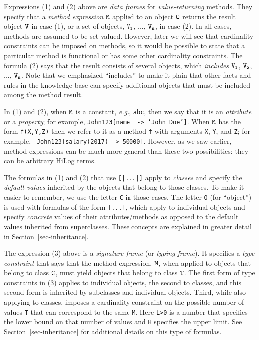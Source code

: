 \documentclass[11pt]{article}
\newcommand{\mvd}{{\mbox{\tt \,->\,}}}  %
\newcommand{\fl}{\mbox{F-logic}\xspace}
\begin{document}
\begin{itemize}
  Expressions (1) and (2) above are \emph{data frames} for
  \emph{value-returning} methods. They specify that a
  \emph{method expression} $\tt M$ applied to an object $\tt O$ returns the
  result object $\tt V$ in case (1), or a set of objects, $\tt V_1$, ...,
  $\tt V_n$, in case (2). In all cases, methods are assumed to be
  set-valued. However, later we will see that cardinality
  constraints can be imposed on methods, so it would be possible to state
  that a particular method is functional or has some other cardinality
  constraints.
  The formula (2) says that
  the result consists of several objects, which \emph{includes} $\tt V_1$,
  $\tt V_2$, ..., $\tt V_n$. Note that we emphasized ``includes''
  to make it plain that other facts and rules in the knowledge base can specify
  additional objects that must be included among the method result.
  
  In (1) and (2),
  when $\tt M$ is a constant, {\it e.g.}, {\tt abc}, then we say that it is
  an \emph{attribute} or a \emph{property}; for example, {\tt John123[name
    \mvd 'John Doe']}. When $\tt
  M$ has the form {\tt f(X,Y,Z)} then we refer to it as a method {\tt f}
  with arguments {\tt X}, {\tt Y}, and {\tt Z}; for example, {\tt
  John123[salary(2017)\mvd 50000]}.  However, as we saw
  earlier, method expressions can be much more general than these two
  possibilities: they can be arbitrary HiLog terms.

  The formulas in (1) and (2)
  that use \texttt{[|...|]} apply to \emph{classes} and
  specify the \emph{default values} inherited by the objects that belong to
  those classes. To make it easier to remember, we use the letter
  \texttt{C} in those cases. The letter \texttt{O} (for ``object'') is used
  with formulas of the form \texttt{[...]}, which apply to individual
  objects and
  specify \emph{concrete} values of their attributes/methods as opposed to the
  default values inherited from superclasses.
  These concepts are explained in greater detail in
  Section~\ref{sec-inheritance}.


  \medskip

  \index{signature!in \fl}
  The expression (3) above is a \emph{signature frame} (or \emph{typing
    frame}). It specifies a
  \emph{type constraint} that says
  that the method expression, $\tt M$, when applied to objects that belong
  to class $\tt C$, must yield objects that belong to class $\tt T$.
  The first form of type constraints
  in (3) applies to individual objects, the second to
  classes, and this second form is inherited by subclasses and individual objects. Third,
  while also applying to classes, imposes a cardinality constraint on the
  possible number of values \texttt{T} that can correspond to the same
  \texttt{M}.  Here \texttt{L>0} is a number that specifies the lower bound
  on that number of values and \texttt{H} specifies the upper limit.
  See Section~\ref{sec-inheritance} for additional details on this type of
  formulas.


\end{itemize}
\end{document}
